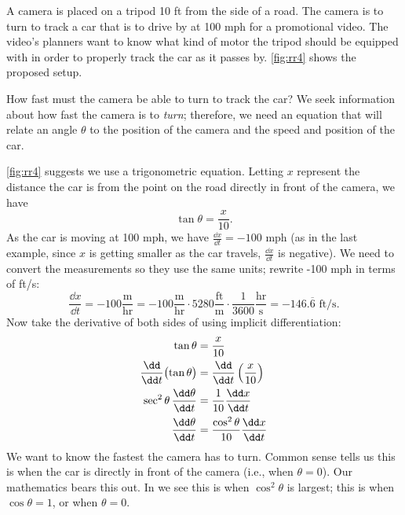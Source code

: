 \begin{example}\label{ex_rr4}%
A camera is placed on a tripod 10 ft from the side of a road. The camera is to turn to track a car that is to drive by at 100 mph for a promotional video. The video's planners want to know what kind of motor the tripod should be equipped with in order to properly track the car as it passes by.  \autoref{fig:rr4} shows the proposed setup.


How fast must the camera be able to turn to track the car?
\solution
We seek information about how fast the camera is to \emph{turn}; therefore, we need an equation that will relate an angle $\theta$ to the position of the camera and the speed and position of the car.

\autoref{fig:rr4} suggests we use a trigonometric equation. Letting $x$ represent the distance the car is from the point on the road directly in front of the camera, we have
\begin{equation}\tan \theta = \frac{x}{10}.\label{eq:rr4}\end{equation}%
As the car is moving at 100 mph, we have $\frac{\dd x}{\dd t} = -100$ mph (as in the last example, since $x$ is getting smaller as the car travels, $\frac{\dd x}{\dd t}$ is negative). We need to convert the measurements so they use the same units; rewrite -100 mph in terms of ft/s:
\[
\frac{\dd x}{\dd t} = -100\frac{\text{m}}{\text{hr}} = -100\frac{\text{m}}{\text{hr}}\cdot5280\frac{\text{ft}}{\text{m}}\cdot\frac{1}{3600}\frac{\text{hr}}{\text{s}} =-146.\overline{6}\text{ ft/s}.
\]
Now take the derivative of both sides of  using implicit differentiation:
\begin{align}
	\tan \theta &= \frac{x}{10} \notag \\
	\frac{\dd}{\dd t}\bigl(\tan \theta\bigr)
	&= \frac{\dd}{\dd t}\left(\frac{x}{10}\right)\notag \\
	\sec^2\theta\,\frac{\dd\theta}{\dd t} &= \frac{1}{10}\frac{\dd x}{\dd t}\notag\\
	\frac{\dd\theta}{\dd t} &= \frac{\cos^2\theta}{10}\frac{\dd x}{\dd t}\label{eq:rr4b}
\end{align}
We want to know the fastest the camera has to turn. Common sense tells us this is when the car is directly in front of the camera (i.e., when $\theta = 0$). Our mathematics bears this out. In  we see this is when $\cos^2\theta$ is largest; this is when $\cos \theta = 1$, or when $\theta = 0$.


\end{example}
